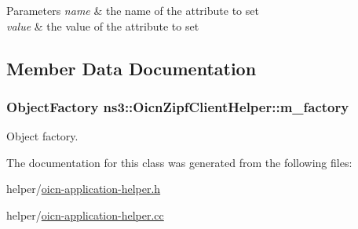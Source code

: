 \begin{DoxyParams}{Parameters}
{\em name} & the name of the attribute to set \\
\hline
{\em value} & the value of the attribute to set \\
\hline
\end{DoxyParams}


\subsection{Member Data Documentation}
\hypertarget{classns3_1_1OicnZipfClientHelper_ae708feab022b48c941fc4c7d70a2357f}{
\subsubsection[{m\-\_\-factory}]{\setlength{\rightskip}{0pt plus 5cm}Object\-Factory ns3\-::\-Oicn\-Zipf\-Client\-Helper\-::m\-\_\-factory\hspace{0.3cm}{\ttfamily [private]}}}\label{classns3_1_1OicnZipfClientHelper_ae708feab022b48c941fc4c7d70a2357f}


Object factory. 



The documentation for this class was generated from the following files\-:\begin{DoxyCompactItemize}
\item 
helper/\hyperlink{oicn-application-helper_8h}{oicn-\/application-\/helper.\-h}\item 
helper/\hyperlink{oicn-application-helper_8cc}{oicn-\/application-\/helper.\-cc}\end{DoxyCompactItemize}

